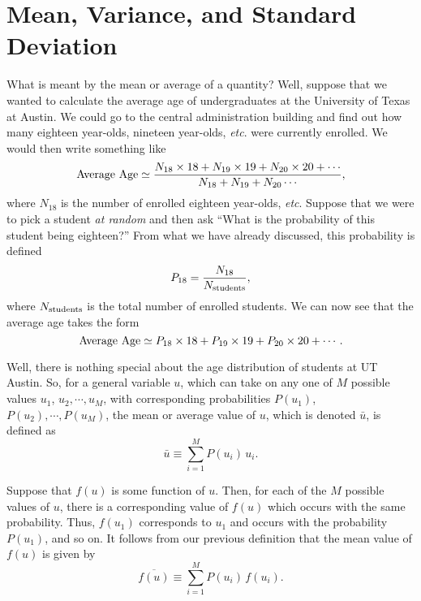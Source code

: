 \section{Mean, Variance, and Standard Deviation}
What is meant by the mean or average of a quantity? Well, suppose that we
wanted to calculate  the average age of undergraduates at the University of Texas at Austin.
We could go to the central administration building and find
out how many eighteen year-olds, nineteen year-olds, {\em etc}. were currently
enrolled. We would then write something like
\begin{equation}
{\rm Average~Age}\/ \simeq \frac{N_{18}\times 18 + N_{19}\times 19 +N_{20}
\times 20+\cdots}
{N_{18}+N_{19}+N_{20}\cdots},
\end{equation}
where $N_{18}$ is the number of enrolled eighteen year-olds, {\em etc}.
Suppose that we were to pick a student {\em at random}\/ and then ask ``What is
the probability of this student being eighteen?'' From what we have
already discussed, this probability is defined
\begin{equation}
P_{18} =
\frac{N_{18}}{N_{\rm students}},
\end{equation}
where $N_{\rm students}$ is the total number of enrolled
students.
 We can now see that the average age takes
the form
\begin{equation}
{\rm Average~Age}\/ \simeq P_{18}\times 18 + P_{19}\times 19 + P_{20}\times 20
+\cdots.
\end{equation}

Well, there is nothing special about the age distribution of students
at UT Austin. So, for a general variable $u$, which can take on any one of $M$
possible values $u_1$, $u_2, \cdots, u_M$, with  corresponding probabilities
$P(u_1)$, $P(u_2),\cdots, P(u_M)$,
the mean or average value of $u$, which
is denoted $\bar{u}$, is defined as
\begin{equation}
\bar{u} \equiv \sum_{i=1}^{M} P(u_i)\, u_i.
\end{equation}

Suppose that $f(u)$ is some function of  $u$. Then, for each of
 the $M$ possible values of $u$, there is a corresponding value 
of $f(u)$ which occurs with the same probability.  Thus, $f(u_1)$ corresponds
to $u_1$ and occurs with the probability $P(u_1)$, and so on. It follows from
our previous definition  that the mean value of $f(u)$ is
given by
\begin{equation}
\overline{f(u)} \equiv \sum_{i=1}^{M} P(u_i)\, f(u_i).
\end{equation} 

